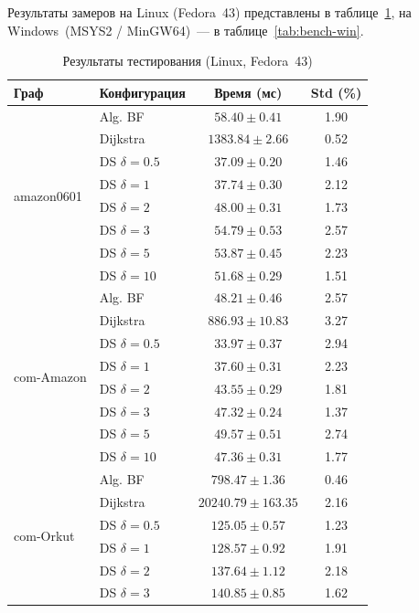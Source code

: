 \documentclass[a4paper]{article}
\begin{document}
Результаты замеров на Linux (Fedora~43) представлены в таблице~\ref{tab:bench-linux},
на Windows~(MSYS2 / MinGW64)~--- в таблице~\ref{tab:bench-win}.


\begin{table}[h!]
\centering
\begin{minipage}{0.48\textwidth}
\centering
\footnotesize
\caption{Результаты тестирования (Linux, Fedora~43)}
\label{tab:bench-linux}
\begin{tabular}{llcc}
\toprule
\textbf{Граф} & \textbf{Конфигурация} & \textbf{Время (мс)} & \textbf{Std (\%)} \\
\midrule
\multirow{8}{*}{amazon0601}
    & Alg. BF & $58.40 \pm 0.41$ & 1.90 \\
    & Dijkstra & $1383.84 \pm 2.66$ & 0.52 \\
    & DS $\delta=0.5$ & $37.09 \pm 0.20$ & 1.46 \\
    & DS $\delta=1$ & $37.74 \pm 0.30$ & 2.12 \\
    & DS $\delta=2$ & $48.00 \pm 0.31$ & 1.73 \\
    & DS $\delta=3$ & $54.79 \pm 0.53$ & 2.57 \\
    & DS $\delta=5$ & $53.87 \pm 0.45$ & 2.23 \\
    & DS $\delta=10$ & $51.68 \pm 0.29$ & 1.51 \\
\midrule
\multirow{8}{*}{com-Amazon}
    & Alg. BF & $48.21 \pm 0.46$ & 2.57 \\
    & Dijkstra & $886.93 \pm 10.83$ & 3.27 \\
    & DS $\delta=0.5$ & $33.97 \pm 0.37$ & 2.94 \\
    & DS $\delta=1$ & $37.60 \pm 0.31$ & 2.23 \\
    & DS $\delta=2$ & $43.55 \pm 0.29$ & 1.81 \\
    & DS $\delta=3$ & $47.32 \pm 0.24$ & 1.37 \\
    & DS $\delta=5$ & $49.57 \pm 0.51$ & 2.74 \\
    & DS $\delta=10$ & $47.36 \pm 0.31$ & 1.77 \\
\midrule
\multirow{8}{*}{com-Orkut}
    & Alg. BF & $798.47 \pm 1.36$ & 0.46 \\
    & Dijkstra & $20240.79 \pm 163.35$ & 2.16 \\
    & DS $\delta=0.5$ & $125.05 \pm 0.57$ & 1.23 \\
    & DS $\delta=1$ & $128.57 \pm 0.92$ & 1.91 \\
    & DS $\delta=2$ & $137.64 \pm 1.12$ & 2.18 \\
    & DS $\delta=3$ & $140.85 \pm 0.85$ & 1.62 \\

\end{tabular}
\end{minipage}
\end{table}
\end{document}
